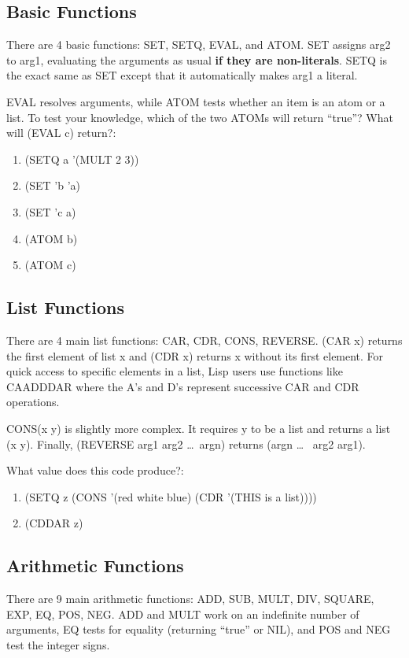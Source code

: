 \documentclass[11pt,letterpaper]{article}
\begin{document}
    \subsection{Basic Functions}
    There are 4 basic functions: SET, SETQ, EVAL, and ATOM.
    SET assigns arg2 to arg1, evaluating the arguments as usual
    \textbf{if they are non-literals}.
    SETQ is the exact same as SET except that it automatically makes arg1
    a literal.

    EVAL resolves arguments, while ATOM tests whether an item is an atom or a list.
    To test your knowledge, which of the two ATOMs will return ``true''?
    What will (EVAL c) return?:
    \begin{enumerate}
        \item (SETQ a '(MULT 2 3))
        \item (SET 'b 'a)
        \item (SET 'c a)
        \item (ATOM b)
        \item (ATOM c)
    \end{enumerate}

    \subsection{List Functions}
    There are 4 main list functions: CAR, CDR, CONS, REVERSE.
    (CAR x) returns the first element of list x and (CDR x) returns
    x without its first element.
    For quick access to specific elements in a list, Lisp users
    use functions like CAADDDAR where the A's and D's represent successive
    CAR and CDR operations.

    CONS(x y) is slightly more complex.
    It requires y to be a list and returns a list (x y).
    Finally, (REVERSE arg1 arg2 \ldots~argn) returns (argn \ldots~ arg2 arg1).

    What value does this code produce?:
    \begin{enumerate}
        \item (SETQ z (CONS '(red white blue) (CDR '(THIS is a list))))
        \item (CDDAR z)
    \end{enumerate}

    \subsection{Arithmetic Functions}
    There are 9 main arithmetic functions: ADD, SUB, MULT, DIV, SQUARE,
    EXP, EQ, POS, NEG.
    ADD and MULT work on an indefinite number of arguments,
    EQ tests for equality (returning ``true'' or NIL),
    and POS and NEG test the integer signs.
\end{document}
